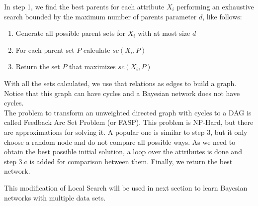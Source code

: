 In step 1, we find the best parents for each attribute $X_i$ performing an exhaustive search bounded by the maximum number of parents parameter $d$, like follows:
\begin{enumerate}
	\item Generate all possible parent sets for $X_i$ with at most size $d$
	\item For each parent set $P$ calculate ${sc}( X_i , P )$
	\item Return the set $P$ that maximizes ${sc}( X_i , P )$
\end{enumerate}

With all the sets calculated, we use that relations as edges to build a graph. Notice that this graph can have cycles and a Bayesian network does not have cycles.\\
The problem to transform an unweighted directed graph with cycles to a DAG is called Feedback Arc Set Problem (or FASP). This problem is NP-Hard, but there are approximations for solving it. A popular one is similar to step 3, but it only choose a random node and do not compare all possible ways. As we need to obtain the best possible initial solution, a loop over the attributes is done and step 3.c is added for comparison between them. Finally, we return the best network.

This modification of Local Search will be used in next section to learn Bayesian networks with multiple data sets.